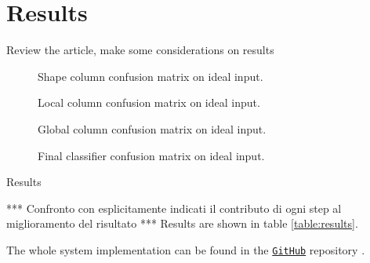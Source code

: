 \section{Results}\label{section:results}
    Review the article, make some considerations on results

    \begin{figure}
        \centering
        \caption{Shape column confusion matrix on ideal input.}\label{fig:shape-confusion}
    \end{figure}

    \begin{figure}
        \centering
        \caption{Local column confusion matrix on ideal input.}\label{fig:local-confusion}
    \end{figure}

    \begin{figure}
        \centering
        \caption{Global column confusion matrix on ideal input.}\label{fig:global-confusion}
    \end{figure}

    \begin{figure}
        \centering
        \caption{Final classifier confusion matrix on ideal input.}\label{fig:final-classifier-confusion}
    \end{figure}

    \begin{table}
        \caption{Results}\label{table:results}
    \end{table}

    \par{
        *** Confronto con esplicitamente indicati il contributo di ogni step al miglioramento del risultato *** Results are shown in table \ref{table:results}.
    }

    \par{
        The whole system implementation can be found in the \href{https://github.com/antonioterpin/wavelet_ml}{\texttt{GitHub}} repository \cite{antonioterpin:github}.
    }

